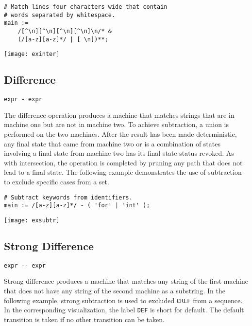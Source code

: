 \documentclass[letterpaper,11pt,oneside]{book}
\newcommand{\verbspace}{\vspace{10pt}}
\newcommand{\graphspace}{\vspace{10pt}}
\newenvironment{inline_code}{\def\baselinestretch{1}\vspace{12pt}\small}{}
\begin{document}
\begin{inline_code}
\begin{verbatim}
# Match lines four characters wide that contain 
# words separated by whitespace.
main :=
    /[^\n][^\n][^\n][^\n]\n/* &
    (/[a-z][a-z]*/ | [ \n])**;
\end{verbatim}
\end{inline_code}
\verbspace
% }%%
% END GENERATE

\graphspace
\begin{center}
\texttt{[image: exinter]}
\end{center}
\graphspace

\subsection{Difference}

\verb|expr - expr|

The difference operation produces a machine that matches
strings that are in machine one but are not in machine two. To achieve subtraction,
a union is performed on the two machines. After the result has been made
deterministic, any final state that came from machine two or is a combination
of states involving a final state from machine two has its final state status
revoked. As with intersection, the operation is completed by pruning any path
that does not lead to a final state.  The following example demonstrates the
use of subtraction to exclude specific cases from a set.

\begin{inline_code}
\begin{verbatim}
# Subtract keywords from identifiers.
main := /[a-z][a-z]*/ - ( 'for' | 'int' );
\end{verbatim}
\end{inline_code}
\verbspace
% }%%
% END GENERATE

\graphspace
\begin{center}
\texttt{[image: exsubtr]}
\end{center}
\graphspace

\subsection{Strong Difference}
\label{strong_difference}

\verb|expr -- expr|

Strong difference produces a machine that matches any string of the first
machine that does not have any string of the second machine as a substring. In
the following example, strong subtraction is used to excluded \verb|CRLF| from
a sequence. In the corresponding visualization, the label \verb|DEF| is short
for default. The default transition is taken if no other transition can be
taken.
\end{document}

